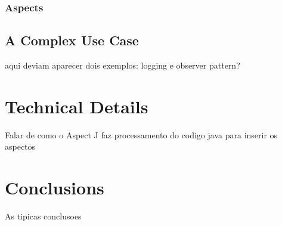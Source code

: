 \documentclass{template}
\begin{document}
\subsubsection{Aspects}

\subsection{A Complex Use Case}

aqui deviam aparecer dois exemplos: logging e observer pattern?

\section{Technical Details}

Falar de como o Aspect J faz processamento do codigo java para inserir os aspectos

\section{Conclusions}

As tipicas conclusoes \cite{Kiczales97aspect-orientedprogramming}




\balancecolumns
\end{document}
